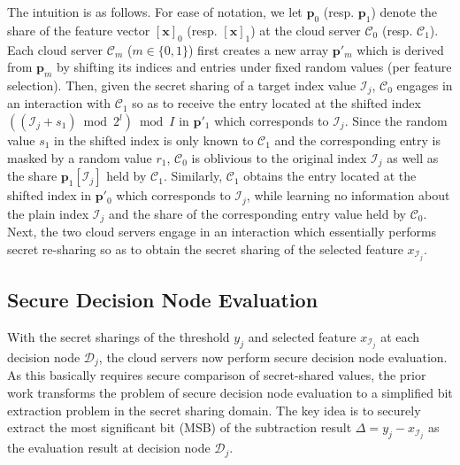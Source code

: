 \documentclass[10pt,journal,compsoc]{IEEEtran}
\begin{document}
The intuition is as follows.
%
For ease of notation, we let $\mathbf{p}_0$ (resp. $\mathbf{p}_1$) denote the share of the feature vector $[\mathbf{x}]_0$ (resp. $[\mathbf{x}]_1$) at the cloud server $\mathcal{C}_0$ (resp. $\mathcal{C}_1$).
%
Each cloud server $\mathcal{C}_m$ ($m\in \{0,1\}$) first creates a new array $\mathbf{p}'_m$ which is derived from $\mathbf{p}_m$ by shifting its indices and entries under fixed random values (per feature selection).
%
Then, given the secret sharing of a target index value $\mathcal{I}_j$, $\mathcal{C}_0$ engages in an interaction with $\mathcal{C}_1$ so as to receive the entry located at the shifted index $((\mathcal{I}_j+s_1) \bmod 2^l) \bmod I$ in $\mathbf{p}'_1$ which corresponds to $\mathcal{I}_j$.
%
Since the random value $s_1$ in the shifted index is only known to $\mathcal{C}_1$ and the corresponding entry is masked by a random value $r_1$, $\mathcal{C}_0$ is oblivious to the original index $\mathcal{I}_j$ as well as the share $\mathbf{p}_1[\mathcal{I}_j]$ held by $\mathcal{C}_1$.
%
Similarly, $\mathcal{C}_1$ obtains the entry located at the shifted index in $\mathbf{p}'_0$ which corresponds to $\mathcal{I}_j$, while learning no information about the plain index $\mathcal{I}_j$ and the share of the corresponding entry value held by $\mathcal{C}_0$.
%
Next, the two cloud servers engage in an interaction which essentially performs secret re-sharing so as to obtain the secret sharing of the selected feature $x_{\mathcal{I}_j}$.



\subsection{Secure Decision Node Evaluation}

With the secret sharings of the threshold $y_j$ and selected feature $x_{\mathcal{I}_j}$ at each decision node $\mathcal{D}_j$, the cloud servers now perform secure decision node evaluation.
%
As this basically requires secure comparison of secret-shared values, the prior work \cite{ZhengDWWN20} transforms the problem of secure decision node evaluation to a simplified bit extraction problem in the secret sharing domain.
%
The key idea is to securely extract the most significant bit (MSB) of the subtraction result $\Delta=y_j-x_{\mathcal{I}_j}$ as the evaluation result at decision node $\mathcal{D}_j$. 
%
\end{document}
